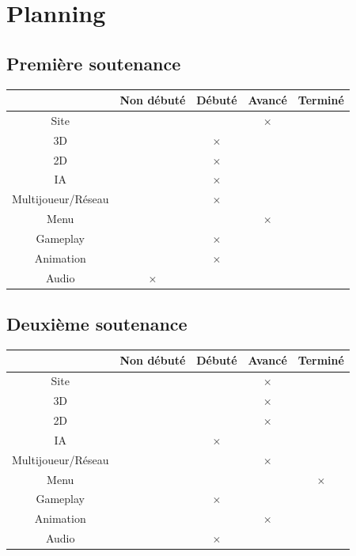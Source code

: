 \documentclass[a4paper, 12pt]{article}
\begin{document}
\section{Planning}
	\subsection{Première soutenance}
	\begin{tabular}{|c||c|c|c|c|}
		\hline
		& Non débuté & Débuté & Avancé & Terminé \\
		\hline
		Site & & & $\times$ & \\
		\hline
		3D & & $\times$ & &  \\
		\hline
		2D & & $\times$ & &  \\
		\hline
		IA & & $\times$ & &\\
		\hline
		Multijoueur/Réseau & & $\times$ & & \\
		\hline
		Menu & & & $\times$ & \\
		\hline
		Gameplay & & $\times$ & & \\
		\hline
		Animation & & $\times$ &  & \\		
		\hline
		Audio & $\times$ &  & &  \\
		\hline		
	\end{tabular}
	\subsection{Deuxième soutenance}
	\begin{tabular}{|c||c|c|c|c|}
		\hline
		& Non débuté & Débuté & Avancé & Terminé\\
		\hline
		Site & & & $\times$ & \\
		\hline
		3D & & & $\times$ & \\
		\hline
		2D & & & $\times$ & \\
		\hline
		IA & & $\times$ & & \\
		\hline
		Multijoueur/Réseau & & & $\times$ & \\
		\hline
		Menu & & & & $\times$\\
		\hline
		Gameplay & & $\times$ & & \\
		\hline
		Animation & & & $\times$ &\\		
		\hline
		Audio & & $\times$ & &\\
		\hline		
	\end{tabular}
\end{document}
